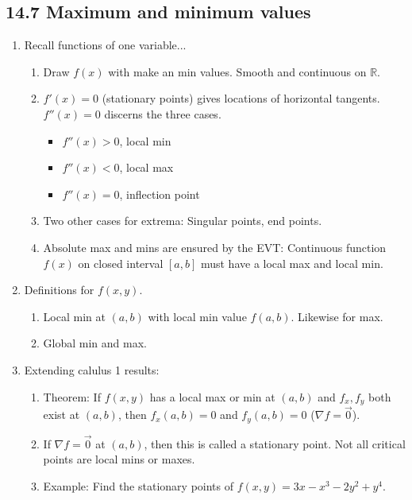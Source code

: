 \documentclass{article}
\begin{document}
\subsection{14.7 Maximum and minimum values}

\begin{enumerate}

\item Recall functions of one variable...
\begin{enumerate}
\item Draw $f(x)$ with make an min values. Smooth and continuous on $\mathbb{R}$.
\item $f'(x)=0$ (stationary points) gives locations of horizontal tangents. $f''(x)=0$ discerns the three cases.
\begin{itemize}
\item $f''(x)>0$, local min
\item $f''(x)<0$, local max
\item $f''(x)=0$, inflection point
\end{itemize}
\item Two other cases for extrema: Singular points, end points.
\item Absolute max and mins are ensured by the EVT: Continuous function $f(x)$ on closed interval $[a,b]$ must have a local max and local min.
\end{enumerate}

\item Definitions for $f(x,y)$.
\begin{enumerate}
\item Local min at $(a,b)$ with local min value $f(a,b)$. Likewise for max.
\item Global min and max.
\end{enumerate}

\item Extending calulus 1 results:
\begin{enumerate}
\item Theorem: If $f(x,y)$ has a local max or min at $(a,b)$ and $f_x, f_y$ both exist at $(a,b)$, then $f_x(a,b)=0$ and $f_y(a,b)=0$ ($\nabla f = \vec{0}$).
\item If $\nabla f = \vec{0}$ at $(a,b)$, then this is called a stationary point. Not all critical points are local mins or maxes.
\item Example: Find the stationary points of $f(x,y)=3x-x^3-2y^2+y^4$.
\end{enumerate}



\end{enumerate}
\end{document}
